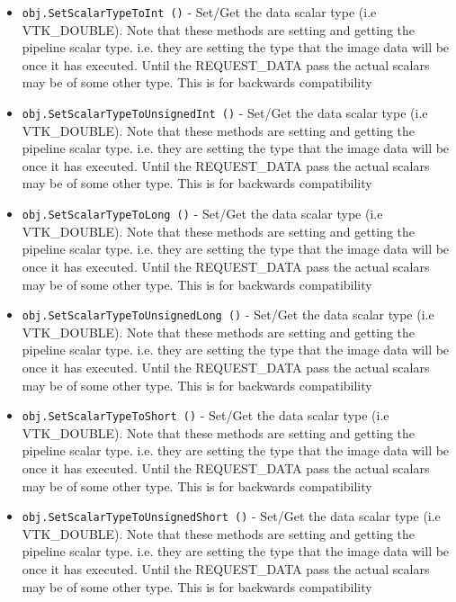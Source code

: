 \begin{itemize}
\item  \verb|obj.SetScalarTypeToInt ()| -  Set/Get the data scalar type (i.e VTK\_DOUBLE). Note that these methods
 are setting and getting the pipeline scalar type. i.e. they are setting
 the type that the image data will be once it has executed. Until the
 REQUEST\_DATA pass the actual scalars may be of some other type. This is
 for backwards compatibility

\item  \verb|obj.SetScalarTypeToUnsignedInt ()| -  Set/Get the data scalar type (i.e VTK\_DOUBLE). Note that these methods
 are setting and getting the pipeline scalar type. i.e. they are setting
 the type that the image data will be once it has executed. Until the
 REQUEST\_DATA pass the actual scalars may be of some other type. This is
 for backwards compatibility

\item  \verb|obj.SetScalarTypeToLong ()| -  Set/Get the data scalar type (i.e VTK\_DOUBLE). Note that these methods
 are setting and getting the pipeline scalar type. i.e. they are setting
 the type that the image data will be once it has executed. Until the
 REQUEST\_DATA pass the actual scalars may be of some other type. This is
 for backwards compatibility

\item  \verb|obj.SetScalarTypeToUnsignedLong ()| -  Set/Get the data scalar type (i.e VTK\_DOUBLE). Note that these methods
 are setting and getting the pipeline scalar type. i.e. they are setting
 the type that the image data will be once it has executed. Until the
 REQUEST\_DATA pass the actual scalars may be of some other type. This is
 for backwards compatibility

\item  \verb|obj.SetScalarTypeToShort ()| -  Set/Get the data scalar type (i.e VTK\_DOUBLE). Note that these methods
 are setting and getting the pipeline scalar type. i.e. they are setting
 the type that the image data will be once it has executed. Until the
 REQUEST\_DATA pass the actual scalars may be of some other type. This is
 for backwards compatibility

\item  \verb|obj.SetScalarTypeToUnsignedShort ()| -  Set/Get the data scalar type (i.e VTK\_DOUBLE). Note that these methods
 are setting and getting the pipeline scalar type. i.e. they are setting
 the type that the image data will be once it has executed. Until the
 REQUEST\_DATA pass the actual scalars may be of some other type. This is
 for backwards compatibility


\end{itemize}
